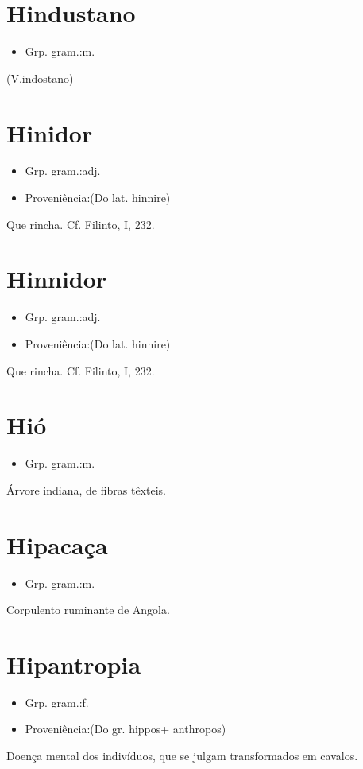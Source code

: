 \documentclass{article}
\begin{document}
\section{Hindustano}
\begin{itemize}
\item {Grp. gram.:m.}
\end{itemize}
(V.indostano)
\section{Hinidor}
\begin{itemize}
\item {Grp. gram.:adj.}
\end{itemize}
\begin{itemize}
\item {Proveniência:(Do lat. \textunderscore hinnire\textunderscore )}
\end{itemize}
Que rincha. Cf. Filinto, I, 232.
\section{Hinnidor}
\begin{itemize}
\item {Grp. gram.:adj.}
\end{itemize}
\begin{itemize}
\item {Proveniência:(Do lat. \textunderscore hinnire\textunderscore )}
\end{itemize}
Que rincha. Cf. Filinto, I, 232.
\section{Hió}
\begin{itemize}
\item {Grp. gram.:m.}
\end{itemize}
Árvore indiana, de fibras têxteis.
\section{Hipacaça}
\begin{itemize}
\item {Grp. gram.:m.}
\end{itemize}
Corpulento ruminante de Angola.
\section{Hipantropia}
\begin{itemize}
\item {Grp. gram.:f.}
\end{itemize}
\begin{itemize}
\item {Proveniência:(Do gr. \textunderscore hippos\textunderscore  + \textunderscore anthropos\textunderscore )}
\end{itemize}
Doença mental dos indivíduos, que se julgam transformados em cavalos.
\end{document}
